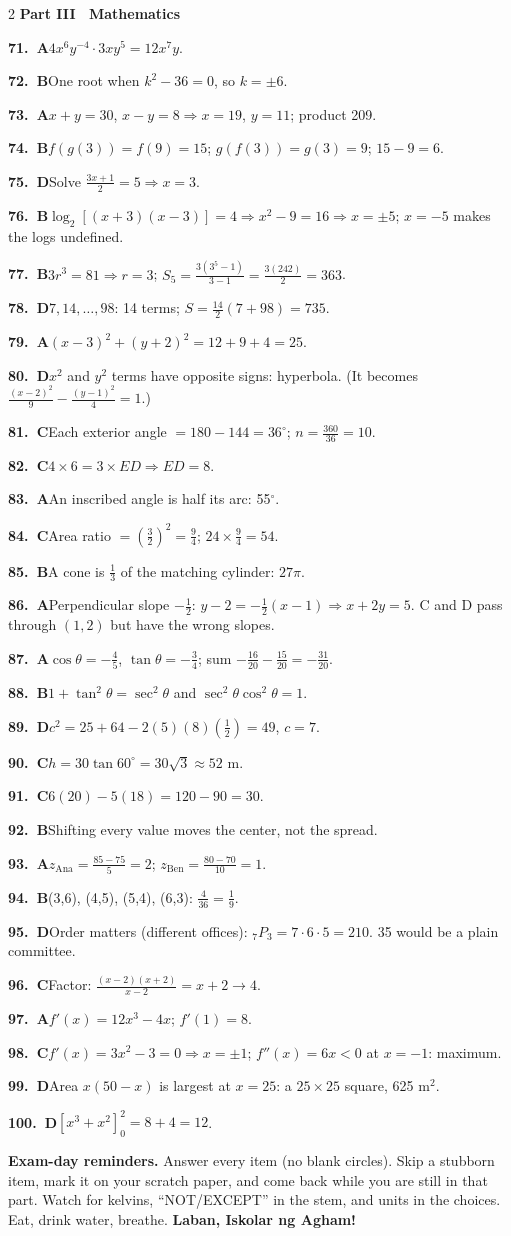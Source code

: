 \documentclass[10pt]{article}
\newcommand{\ans}[3]{\par\noindent\textbf{#1.~\textcolor{dblue}{#2}}\enspace #3}
\begin{document}
\begin{multicols}{2}
{\sffamily\bfseries\color{dblue}Part III \textbullet\ Mathematics}
\ans{71}{A}{$4x^6y^{-4}\cdot3xy^5=12x^7y$.}
\ans{72}{B}{One root when $k^2-36=0$, so $k=\pm6$.}
\ans{73}{A}{$x+y=30$, $x-y=8\Rightarrow x=19$, $y=11$; product 209.}
\ans{74}{B}{$f(g(3))=f(9)=15$; $g(f(3))=g(3)=9$; $15-9=6$.}
\ans{75}{D}{Solve $\frac{3x+1}{2}=5\Rightarrow x=3$.}
\ans{76}{B}{$\log_2[(x+3)(x-3)]=4\Rightarrow x^2-9=16\Rightarrow x=\pm5$; $x=-5$ makes the logs undefined.}
\ans{77}{B}{$3r^3=81\Rightarrow r=3$; $S_5=\frac{3(3^5-1)}{3-1}=\frac{3(242)}2=363$.}
\ans{78}{D}{$7,14,\ldots,98$: 14 terms; $S=\frac{14}2(7+98)=735$.}
\ans{79}{A}{$(x-3)^2+(y+2)^2=12+9+4=25$.}
\ans{80}{D}{$x^2$ and $y^2$ terms have opposite signs: hyperbola. (It becomes $\frac{(x-2)^2}9-\frac{(y-1)^2}4=1$.)}
\ans{81}{C}{Each exterior angle $=180-144=36^\circ$; $n=\frac{360}{36}=10$.}
\ans{82}{C}{$4\times6=3\times ED\Rightarrow ED=8$.}
\ans{83}{A}{An inscribed angle is half its arc: 55$^\circ$.}
\ans{84}{C}{Area ratio $=(\frac32)^2=\frac94$; $24\times\frac94=54$.}
\ans{85}{B}{A cone is $\frac13$ of the matching cylinder: $27\pi$.}
\ans{86}{A}{Perpendicular slope $-\frac12$: $y-2=-\frac12(x-1)\Rightarrow x+2y=5$. C and D pass through $(1,2)$ but have the wrong slopes.}
\ans{87}{A}{$\cos\theta=-\frac45$, $\tan\theta=-\frac34$; sum $-\frac{16}{20}-\frac{15}{20}=-\frac{31}{20}$.}
\ans{88}{B}{$1+\tan^2\theta=\sec^2\theta$ and $\sec^2\theta\cos^2\theta=1$.}
\ans{89}{D}{$c^2=25+64-2(5)(8)(\frac12)=49$, $c=7$.}
\ans{90}{C}{$h=30\tan60^\circ=30\sqrt3\approx52$ m.}
\ans{91}{C}{$6(20)-5(18)=120-90=30$.}
\ans{92}{B}{Shifting every value moves the center, not the spread.}
\ans{93}{A}{$z_\text{Ana}=\frac{85-75}5=2$; $z_\text{Ben}=\frac{80-70}{10}=1$.}
\ans{94}{B}{(3,6), (4,5), (5,4), (6,3): $\frac4{36}=\frac19$.}
\ans{95}{D}{Order matters (different offices): $_7P_3=7\cdot6\cdot5=210$. 35 would be a plain committee.}
\ans{96}{C}{Factor: $\frac{(x-2)(x+2)}{x-2}=x+2\to4$.}
\ans{97}{A}{$f'(x)=12x^3-4x$; $f'(1)=8$.}
\ans{98}{C}{$f'(x)=3x^2-3=0\Rightarrow x=\pm1$; $f''(x)=6x<0$ at $x=-1$: maximum.}
\ans{99}{D}{Area $x(50-x)$ is largest at $x=25$: a $25\times25$ square, 625 m$^2$.}
\ans{100}{D}{$\left[x^3+x^2\right]_0^2=8+4=12$.}

\vspace{4pt}
\begin{tcolorbox}[enhanced, colback=palegold, colframe=dgold, boxrule=0pt, leftrule=3pt, sharp corners,
  left=5pt, right=5pt, top=2pt, bottom=2pt, before skip=2pt, after skip=0pt]
{\sffamily\bfseries\color{dgold!55!black}Exam-day reminders.} Answer every item (no blank circles). Skip a stubborn item, mark it on your scratch paper, and come back while you are still in that part. Watch for kelvins, ``NOT/EXCEPT'' in the stem, and units in the choices. Eat, drink water, breathe. \textbf{Laban, Iskolar ng Agham!}
\end{tcolorbox}
\end{multicols}
\end{document}
